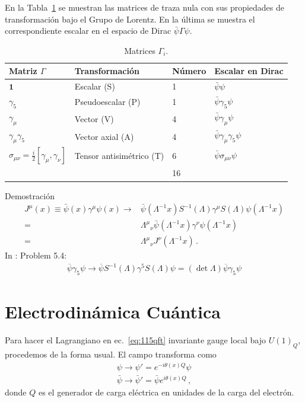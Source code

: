 En la Tabla~\ref{tab:Gamma} se muestran las matrices de traza nula con sus propiedades de transformación bajo el Grupo de Lorentz. En la última se muestra el correspondiente escalar en el espacio de Dirac $\bar\psi\Gamma\psi$.
\begin{table} %
  \centering %
  \begin{tabular}{l|l|l|l} %
Matriz $\Gamma$&Transformación&Número&Escalar en Dirac\\\hline{}
$\mathbf{1}$&Escalar (S)&1&$\bar\psi\psi$\\
$\gamma_5$&Pseudoescalar (P)&1&$\bar\psi\gamma_5\psi$\\
$\gamma_\mu$&Vector (V)&4&$\bar\psi\gamma_\mu\psi$\\
$\gamma_\mu\gamma_5$ &Vector axial (A)&4&$\bar\psi\gamma_\mu\gamma_5\psi$\\
$\sigma_{\mu\nu}=\frac{i}{2}\left[\gamma_\mu,\gamma_\nu\right]$&Tensor antisimétrico (T)&6&$\bar\psi\sigma_{\mu\nu}\psi$\\\hline{}
&&16&\\
  \end{tabular} %
  \caption{Matrices $\Gamma_i$.} %
\label{tab:Gamma} %
\end{table} %
Demostración
\begin{align}
J^\mu(x)\equiv  \bar\psi(x)\gamma^\mu\psi(x)\to&\bar\psi(\Lambda^{-1}x)S^{-1}(\Lambda)\gamma^\mu S(\Lambda)\psi(\Lambda^{-1}x) \nonumber\\
=&{\Lambda^\mu}_\nu\bar\psi(\Lambda^{-1}x) \gamma^\nu\psi(\Lambda^{-1}x) \nonumber\\
=&{\Lambda^\mu}_\nu J^\nu(\Lambda^{-1}x)\,.
\end{align}
In \cite{Gross:1993}: Problem 5.4:
\begin{align}
  \overline{\psi}\gamma_5\psi\to\overline{\psi}S^{-1}(\Lambda)\gamma^5S(\Lambda)\psi =(\det\Lambda)\overline{\psi}\gamma_5\psi
\end{align}


\section{Electrodinámica Cuántica}
\label{sec:electr-cuant}

Para hacer el Lagrangiano en ec.~\eqref{eq:115qft} invariante gauge local bajo $U(1)_Q$, procedemos de la forma usual. El campo transforma como
\begin{align}
  \psi\to\psi'=e^{-i\theta(x)Q}\psi\nonumber\\
  \bar{\psi}\to\bar{\psi}'=\bar{\psi}e^{i\theta(x)Q}\,,
\end{align}
donde $Q$ es el generador de carga eléctrica en unidades de la carga del electrón.

